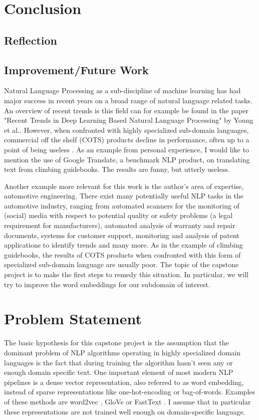 \documentclass[10pt,a4paper]{article}
\begin{document}
	\section{Conclusion}
	\subsection{Reflection}
	\subsection{Improvement/Future Work}
	
	
	Natural Language Processing as a sub-discipline of machine learning has had major success in recent years on a broad range of natural language related tasks. An overview of recent trends is this field can for example be found in the paper \cite{1708.02709} "Recent Trends in Deep Learning Based Natural Language Processing" by Young et al.. 
	However, when confronted with highly specialized sub-domain languages, commercial off the shelf (COTS) products decline in performance, often up to a point of being useless \cite{OilandGas}. As an example from personal experience, I would like to mention the use of Google Translate, a benchmark NLP product, on translating text from climbing guidebooks. The results are funny, but utterly useless.
	
	Another example more relevant for this work is the author's area of expertise, automotive engineering. There exist many potentially useful NLP tasks in the automotive industry, ranging from automated scanners for the monitoring of (social) media with respect to potential quality or safety problems (a legal requirement for manufacturers), automated analysis of warranty and repair documents, systems for customer support, monitoring and analysis of patent applications to identify trends and many more.
	As in the example of climbing guidebooks, the results of COTS products when confronted with this form of specialized sub-domain language are usually poor. 
	The topic of the capstone project is to make the first steps to remedy this situation. In particular, we will try to improve the word embeddings for our subdomain of interest.
	
	\section{Problem Statement}
	The basic hypothesis for this capstone project is the assumption that the dominant problem of NLP algorithms operating in highly specialized domain languages is the fact that during training the algorithm hasn't seen any or enough domain specific text. 
	One important element of most modern NLP pipelines is a dense vector representation, also referred to as word embedding, instead of sparse representations like one-hot-encoding or bag-of-words. Examples of these methods are word2vec \cite{word2vec}, GloVe \cite{pennington2014glove} or FastText \cite{bojanowski2017enriching}. I assume that in particular these representations are not trained well enough on domain-specific language. 
	
\end{document}
